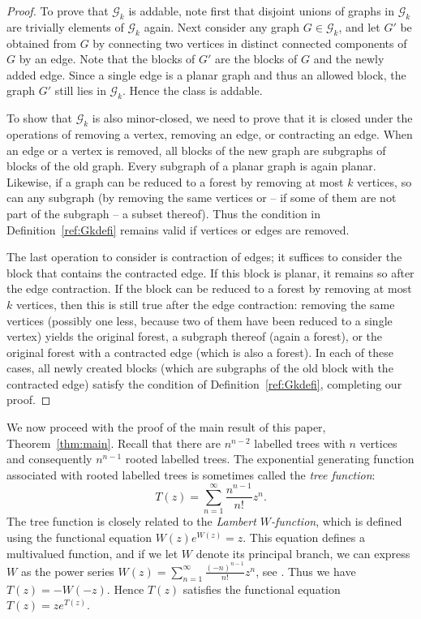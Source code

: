 \documentclass[a4paper]{article}
\newcommand{\G}{\mathcal{G}}
\theoremstyle{remark}
\begin{document}
\begin{proof}
To prove that $\G_k$ is addable, note first that disjoint unions of graphs in $\G_k$ are trivially elements of $\G_k$ again. Next consider any graph $G \in \G_k$, and let $G'$ be obtained from $G$ by connecting two vertices in distinct connected components of $G$ by an edge. Note that the blocks of $G'$ are the blocks of $G$ and the newly added edge. Since a single edge is a planar graph and thus an allowed block, the graph $G'$ still lies in $\G_k$. Hence the class is addable.

To show that $\G_k$ is also minor-closed, we need to prove that it is closed under the operations of removing a vertex, removing an edge, or contracting an edge. When an edge or a vertex is removed, all blocks of the new graph are subgraphs of blocks of the old graph. Every subgraph of a planar graph is again planar. Likewise, if a graph can be reduced to a forest by removing at most $k$ vertices, so can any subgraph (by removing the same vertices or -- if some of them are not part of the subgraph -- a subset thereof). Thus the condition in Definition~\ref{ref:Gkdefi} remains valid if vertices or edges are removed.

The last operation to consider is contraction of edges; it suffices to consider the block that contains the contracted edge. If this block is planar, it remains so after the edge contraction. If the block can be reduced to a forest by removing at most $k$ vertices, then this is still true after the edge contraction: removing the same vertices (possibly one less, because two of them have been reduced to a single vertex) yields the original forest, a subgraph thereof (again a forest), or the original forest with a contracted edge (which is also a forest). In each of these cases, all newly created blocks (which are subgraphs of the old block with the contracted edge) satisfy the condition of Definition~\ref{ref:Gkdefi}, completing our proof.
\end{proof}

We now proceed with the proof of the main result of this paper, Theorem~\ref{thm:main}.
Recall that there are $n^{n-2}$ labelled trees with $n$ vertices and consequently $n^{n-1}$ rooted labelled trees. The exponential generating function associated with rooted labelled trees is sometimes called the \emph{tree function}:
$$T(z) = \sum_{n=1}^{\infty} \frac{n^{n-1}}{n!} z^n.$$
The tree function is closely related to the \emph{Lambert $W$-function}, which is defined using the functional equation $W(z) e^{W(z)} = z$. This equation defines a multivalued function, and if we let $W$ denote its principal branch, we can express $W$ as the power series $W(z) = \sum_{n=1}^{\infty} \frac{(-n)^{n-1}}{n!} z^n$, see \cite{CGHJK,JosDer}. Thus we have $T(z) = -W(-z)$. Hence $T(z)$ satisfies the functional equation $T(z) = z e^{T(z)}$.
\end{document}
